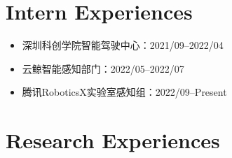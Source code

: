 \documentclass[11pt,a4paper,sans]{moderncv}        %
\begin{document}
\section{Intern Experiences}

\begin{itemize}

\item{深圳科创学院智能驾驶中心：2021/09--2022/04}

\item{云鲸智能感知部门：2022/05--2022/07}

\item{腾讯RoboticsX实验室感知组：2022/09--Present}

\end{itemize}


\section{Research Experiences}
\end{document}
